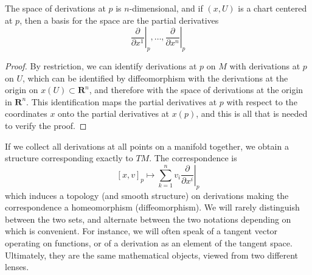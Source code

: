 \begin{theorem}
    The space of derivations at $p$ is $n$-dimensional, and if $(x,U)$ is a chart centered at $p$, then a basis for the space are the partial derivatives
    \[ \left.\frac{\partial}{\partial x^1}\right|_p, \dots, \left.\frac{\partial}{\partial x^n}\right|_p \]
\end{theorem}
\begin{proof}
    By restriction, we can identify derivations at $p$ on $M$ with derivations at $p$ on $U$, which can be identified by diffeomorphism with the derivations at the origin on $x(U) \subset \mathbf{R}^n$, and therefore with the space of derivations at the origin in $\mathbf{R}^n$. This identification maps the partial derivatives at $p$ with respect to the coordinates $x$ onto the partial derivatives at $x(p)$, and this is all that is needed to verify the proof.
\end{proof}

If we collect all derivations at all points on a manifold together, we obtain a structure corresponding exactly to $TM$. The correspondence is
%
\[ [x,v]_p \mapsto \sum_{k = 1}^n v_i \left.\frac{\partial}{\partial x^i}\right|_p \]
%
which induces a topology (and smooth structure) on derivations making the correspondence a homeomorphism (diffeomorphism). We will rarely distinguish between the two sets, and alternate between the two notations depending on which is convenient. For instance, we will often speak of a tangent vector operating on functions, or of a derivation as an element of the tangent space. Ultimately, they are the same mathematical objects, viewed from two different lenses.

